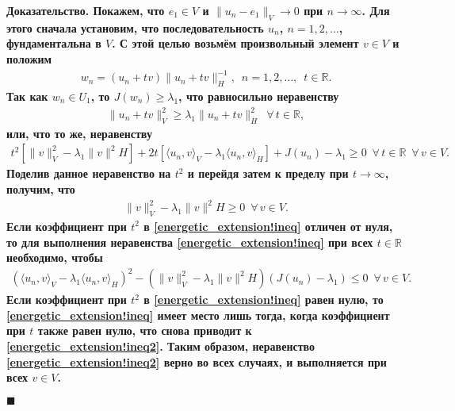 \documentclass{report}
\newenvironment{Proof}{\par\noindent\bf Доказательство.\rm}{ $\blacksquare$\par}
\begin{document}
\begin{Proof}
Покажем, что $e_1\in V$ и $\|u_n-e_1\|_V\to0$ при $n\to\infty$. Для этого сначала установим, что последовательность $u_n$, $n=1,2,\dots$, фундаментальна в $V$. С этой целью возьмём
произвольный элемент $v\in V$ и положим
\begin{gather*}
w_n=(u_n+tv)\|u_n+tv\|_H^{-1},\,\,\,n=1,2,\dots,\,\,\,t\in\mathbb{R}.
\end{gather*}
Так как $w_n\in U_1$, то $J(w_n)\geqslant\lambda_1$, что равносильно неравенству
\begin{gather*}
\|u_n+tv\|^2_V\geqslant\lambda_1\|u_n+tv\|_H^2\,\,\,\forall\,t\in\mathbb{R},
\end{gather*}
или, что то же, неравенству
\begin{gather}\label{energetic_extension!ineq}
t^2[\|v\|^2_V-\lambda_1\|v\|^2H]+2t[\langle u_n,v\rangle_V-\lambda_1\langle u_n,v\rangle_H]+J(u_n)-\lambda_1\geqslant0\,\,\,\forall\,t\in\mathbb{R}\,\,\,\forall\,v\in V.
\end{gather}
Поделив данное неравенство на $t^2$ и перейдя затем к пределу при $t\to\infty$, получим, что
\begin{gather}\label{energetic_extension!vVH.ineq}
\|v\|^2_V-\lambda_1\|v\|^2H\geqslant0\,\,\,\forall\,v\in V.
\end{gather}
Если коэффициент при $t^2$ в \eqref{energetic_extension!ineq} отличен от нуля, то для выполнения неравенства \eqref{energetic_extension!ineq} при всех $t\in\mathbb{R}$ необходимо, чтобы
\begin{gather}\label{energetic_extension!ineq2}
(\langle u_n,v\rangle_V-\lambda_1\langle u_n,v\rangle_H)^2-(\|v\|^2_V-\lambda_1\|v\|^2H)(J(u_n)-\lambda_1)\leqslant0\,\,\,\forall\,v\in V.
\end{gather}
Если коэффициент при $t^2$ в \eqref{energetic_extension!ineq} равен нулю, то \eqref{energetic_extension!ineq} имеет место лишь тогда, когда коэффициент при $t$ также равен нулю, что снова
приводит к \eqref{energetic_extension!ineq2}. Таким образом, неравенство \eqref{energetic_extension!ineq2} верно во всех случаях, и выполняется при всех $v\in V$.


\end{Proof}
\end{document}
